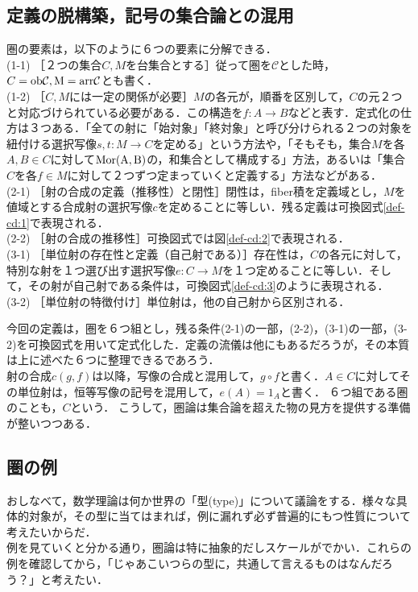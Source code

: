 \documentclass[uplatex, 12pt, a4paper, dvipdfmx]{jsarticle}
\begin{document}
\subsection{定義の脱構築，記号の集合論との混用}

圏の要素は，以下のように６つの要素に分解できる．\\
(1-1) \; ［２つの集合$C,M$を台集合とする］従って圏を$\mathcal{C}$とした時，$C=\rm{ob}\mathcal{C}, M=\rm{arr}\mathcal{C}$とも書く．\\
(1-2) \; ［$C,M$には一定の関係が必要］$M$の各元が，順番を区別して，$C$の元２つと対応づけられている必要がある．この構造を$f:A\longrightarrow B$などと表す．定式化の仕方は３つある．「全ての射に「始対象」「終対象」と呼び分けられる２つの対象を紐付ける選択写像$s,t:M\longrightarrow C$を定める」という方法や，「そもそも，集合$M$を各$A,B\in C$に対して$\rm{Mor}(A,B)$の，和集合として構成する」方法，あるいは「集合$C$を各$f\in M$に対して２つずつ定まっていくと定義する」方法などがある．\\
(2-1) \; ［射の合成の定義（推移性）と閉性］閉性は，fiber積を定義域とし，$M$を値域とする合成射の選択写像$c$を定めることに等しい．残る定義は可換図式\ref{def-cd:1}で表現される．\\
(2-2) \; ［射の合成の推移性］可換図式では図\ref{def-cd:2}で表現される．\\
(3-1) \; ［単位射の存在性と定義（自己射である）］存在性は，$C$の各元に対して，特別な射を１つ選び出す選択写像$e:C\longrightarrow M$を１つ定めることに等しい．そして，その射が自己射である条件は，可換図式\ref{def-cd:3}のように表現される．\\
(3-2) \; ［単位射の特徴付け］単位射は，他の自己射から区別される．\par

今回の定義は，圏を６つ組とし，残る条件(2-1)の一部，(2-2)，(3-1)の一部，(3-2)を可換図式を用いて定式化した．定義の流儀は他にもあるだろうが，その本質は上に述べた６つに整理できるであろう．\\
射の合成$c(g,f)$は以降，写像の合成と混用して，$g\circ f$と書く．$A\in C$に対してその単位射は，恒等写像の記号を混用して，$e(A)=1_A$と書く．
６つ組である圏のことも，$C$という．
こうして，圏論は集合論を超えた物の見方を提供する準備が整いつつある．

\subsection{圏の例}
おしなべて，数学理論は何か世界の「型(type)」について議論をする．様々な具体的対象が，その型に当てはまれば，例に漏れず必ず普遍的にもつ性質について考えたいからだ．\\
例を見ていくと分かる通り，圏論は特に抽象的だしスケールがでかい．これらの例を確認してから，「じゃあこいつらの型に，共通して言えるものはなんだろう？」と考えたい．
\end{document}
